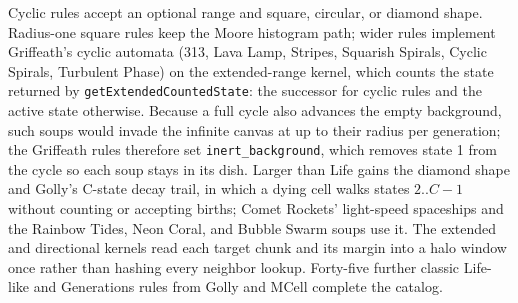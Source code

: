 Cyclic rules accept an optional range and square, circular, or diamond shape.
Radius-one square rules keep the Moore histogram path; wider rules implement
Griffeath's cyclic automata (313, Lava Lamp, Stripes, Squarish Spirals, Cyclic
Spirals, Turbulent Phase) on the extended-range kernel, which counts the state
returned by \texttt{getExtendedCountedState}: the successor for cyclic rules
and the active state otherwise. Because a full cycle also advances the empty
background, such soups would invade the infinite canvas at up to their radius
per generation; the Griffeath rules therefore set \texttt{inert\_background},
which removes state 1 from the cycle so each soup stays in its dish. Larger than Life gains the diamond shape and
Golly's C-state decay trail, in which a dying cell walks states $2..C-1$
without counting or accepting births; Comet Rockets' light-speed spaceships and
the Rainbow Tides, Neon Coral, and Bubble Swarm soups use it. The extended and
directional kernels read each target chunk and its margin into a halo window
once rather than hashing every neighbor lookup. Forty-five further classic
Life-like and Generations rules from Golly and MCell complete the catalog.

